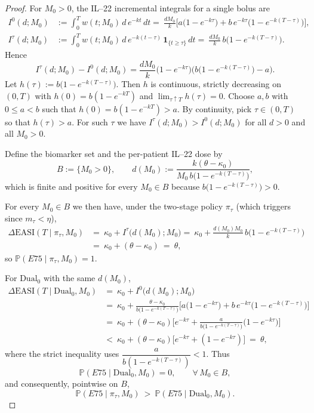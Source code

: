 \begin{proof}
For $M_0>0$, the IL--22 incremental integrals for a single bolus are
\[
\begin{aligned}
I^{0}(d;M_0)&:=\int_0^T w(t;M_0)\,d\,e^{-kt}\,dt
=\ \frac{d M_0}{k}\Big[a\big(1-e^{-k\tau}\big)+b\,e^{-k\tau}\big(1-e^{-k(T-\tau)}\big)\Big],\\[1mm]
I^{\tau}(d;M_0)&:=\int_0^T w(t;M_0)\,d\,e^{-k(t-\tau)}\,\mathbf{1}_{\{t\ge\tau\}}\,dt
=\ \frac{d M_0}{k}\,b\big(1-e^{-k(T-\tau)}\big).
\end{aligned}
\]
Hence
\[
I^{\tau}(d;M_0)-I^{0}(d;M_0)=\frac{d M_0}{k}\big(1-e^{-k\tau}\big)\Big(b\big(1-e^{-k(T-\tau)}\big)-a\Big).
\]
Let $h(\tau):=b\big(1-e^{-k(T-\tau)}\big)$. Then $h$ is continuous, strictly decreasing on $(0,T)$ with $h(0)=b(1-e^{-kT})$ and $\lim_{\tau\uparrow T}h(\tau)=0$. Choose $a,b$ with $0\le a<b$ such that $h(0)=b(1-e^{-kT})>a$. By continuity, pick $\tau\in(0,T)$ so that $h(\tau)>a$. For such $\tau$ we have $I^{\tau}(d;M_0)>I^{0}(d;M_0)$ for all $d>0$ and all $M_0>0$.

Define the biomarker set and the per-patient IL--22 dose by
\[
B:=\{M_0>0\},\qquad d(M_0):=\frac{k(\theta-\kappa_0)}{M_0\,b\big(1-e^{-k(T-\tau)}\big)},
\]
which is finite and positive for every $M_0\in B$ because $b\big(1-e^{-k(T-\tau)}\big)>0$.

For every $M_0\in B$ we then have, under the two-stage policy $\pi_{\tau}$ (which triggers since $m_{\tau}<\eta$),
\[
\begin{aligned}
\Delta\mathrm{EASI}(T\mid \pi_{\tau},M_0)
&=\ \kappa_0+I^{\tau}\big(d(M_0);M_0\big)
=\ \kappa_0+\frac{d(M_0) M_0}{k}\,b\big(1-e^{-k(T-\tau)}\big)\\
&=\ \kappa_0+(\theta-\kappa_0)\ =\ \theta,
\end{aligned}
\]
so $\mathbb{P}(E75\mid \pi_{\tau},M_0)=1$.

For $\mathrm{Dual}_0$ with the same $d(M_0)$,
\[
\begin{aligned}
\Delta\mathrm{EASI}(T\mid \mathrm{Dual}_0,M_0)
&=\ \kappa_0+I^{0}\big(d(M_0);M_0\big)\\
&=\ \kappa_0+\frac{\theta-\kappa_0}{b\big(1-e^{-k(T-\tau)}\big)}\Big[a\big(1-e^{-k\tau}\big)+b\,e^{-k\tau}\big(1-e^{-k(T-\tau)}\big)\Big]\\
&=\ \kappa_0+(\theta-\kappa_0)\Big[e^{-k\tau}+\frac{a}{b\big(1-e^{-k(T-\tau)}\big)}\big(1-e^{-k\tau}\big)\Big]\\
&<\ \kappa_0+(\theta-\kappa_0)\big[e^{-k\tau}+(1-e^{-k\tau})\big]\ =\ \theta,
\end{aligned}
\]
where the strict inequality uses $\dfrac{a}{b(1-e^{-k(T-\tau)})}<1$. Thus
\[
\mathbb{P}(E75\mid \mathrm{Dual}_0,M_0)=0,\qquad \forall\,M_0\in B,
\]
and consequently, pointwise on $B$,
\[
\mathbb{P}(E75\mid \pi_{\tau},M_0)\ >\ \mathbb{P}(E75\mid \mathrm{Dual}_0,M_0).
\]


\end{proof}
